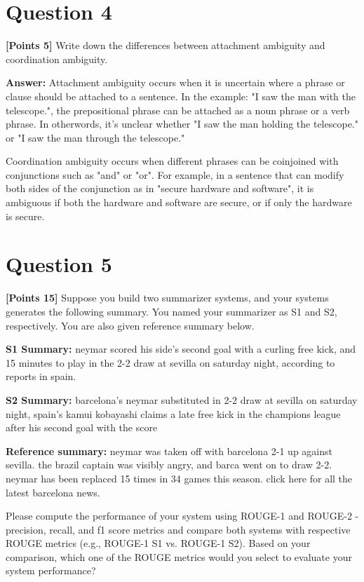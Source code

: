 \documentclass[12pt]{article}
\begin{document}
\newpage
\section*{Question 4}
\textbf{[Points 5]} Write down the differences between attachment ambiguity and
coordination ambiguity.

\textbf{Answer:} Attachment ambiguity occurs when it is uncertain where a phrase
or clause should be attached to a sentence. In the example: "I saw the man with
the telescope.", the prepositional phrase can be attached as a noun phrase or a
verb phrase. In otherwords, it's unclear whether "I saw the man holding the
telescope." or "I saw the man through the telescope."

Coordination ambiguity occurs when different phrases can be coinjoined with
conjunctions such as "and" or "or". For example, in a sentence that can modify
both sides of the conjunction as in "secure hardware and software", it is
ambiguous if both the hardware and software are secure, or if only the hardware
is secure.

\newpage
\section*{Question 5}
\textbf{[Points 15]} Suppose you build two summarizer systems, and your systems
generates the following summary. You named your summarizer as S1 and S2,
respectively. You are also given reference summary below.

\textbf{S1 Summary:} neymar scored his side's second goal with a curling free
kick, and 15 minutes to play in the 2-2 draw at sevilla on saturday night,
according to reports in spain.

\textbf{S2 Summary:} barcelona's neymar substituted in 2-2 draw at sevilla on
saturday night, spain's kamui kobayashi claims a late free kick in the champions
league after his second goal with the score

\textbf{Reference summary:} neymar was taken off with barcelona 2-1 up against
sevilla. the brazil captain was visibly angry, and barca went on to draw 2-2.
neymar has been replaced 15 times in 34 games this season. click here for all
the latest barcelona news.

Please compute the performance of your system using ROUGE-1 and ROUGE-2 -
precision, recall, and f1 score metrics and compare both systems with respective
ROUGE metrics (e.g., ROUGE-1 S1 vs. ROUGE-1 S2). Based on your comparison, which
one of the ROUGE metrics would you select to evaluate your system performance?
\end{document}
